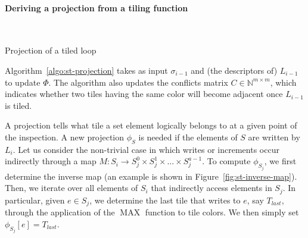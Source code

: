 \paragraph{Deriving a projection from a tiling function}

\begin{algorithm}[t]
\nonl ~\\
\caption{Projection of a tiled loop}
\label{algo:st-projection}
\end{algorithm}

Algorithm~\ref{algo:st-projection} takes as input $\sigma_{i-1}$ and (the descriptors of) $L_{i-1}$ to update $\Phi$. The algorithm also updates the conflicts matrix $C \in \mathbb{N}^{m \times m}$, which indicates whether two tiles having the same color will become adjacent once $L_{i-1}$ is tiled. 

A projection tells what tile a set element logically belongs to at a given point of the inspection. A new projection $\phi_{S}$ is needed if the elements of $S$ are written by $L_i$. Let us consider the non-trivial case in which writes or increments occur indirectly through a map $M : S_i \rightarrow S_j^0 \times S_j^1 \times ... \times S_j^{a-1}$. To compute $\phi_{S_{j}}$, we first determine the inverse map (an example is shown in Figure~\ref{fig:st-inverse-map}). Then, we iterate over all elements of $S_i$ that indirectly access elements in $S_j$. In particular, given $e \in S_j$, we determine the last tile that writes to $e$, say $T_{last}$, through the application of the $\operatorname{MAX}$ function to tile colors. We then simply set $\phi_{S_{j}}[e] = T_{last}$. 


